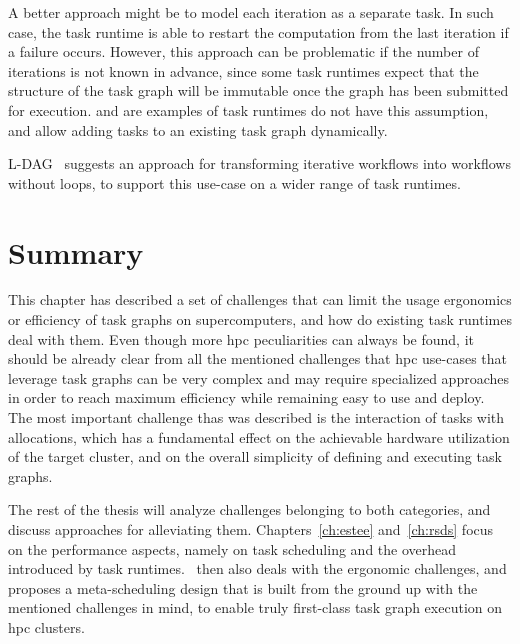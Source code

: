 A better approach might be to model each iteration as a separate task. In such case, the task
runtime is able to restart the computation from the last iteration if a failure occurs. However,
this approach can be problematic if the number of iterations is not known in advance, since some
task runtimes expect that the structure of the task graph will be immutable once the graph has been
submitted for execution. \dask{} and \ray{} are examples of task
runtimes do not have this assumption, and allow adding tasks to an existing task graph dynamically.

\textsc{L-DAG}~\cite{l-dag} suggests an approach for
transforming iterative workflows into workflows without loops, to support this use-case on a wider
range of task runtimes.

\section*{Summary}
This chapter has described a set of challenges that can limit the usage ergonomics or efficiency of
task graphs on supercomputers, and how do existing task runtimes deal with them. Even though more
\gls{hpc} peculiarities can always be found, it should be already clear from all the
mentioned challenges that \gls{hpc} use-cases that leverage task graphs can be very
complex and may require specialized approaches in order to reach maximum efficiency while remaining
easy to use and deploy. The most important challenge thas was described is the interaction of tasks
with allocations, which has a fundamental effect on the achievable hardware utilization of the
target cluster, and on the overall simplicity of defining and executing task graphs.

The rest of the thesis will analyze challenges belonging to both categories, and discuss approaches
for alleviating them. Chapters~\ref{ch:estee} and~\ref{ch:rsds} focus on the
performance aspects, namely on task scheduling and the overhead introduced by task
runtimes.~ then also deals with the ergonomic challenges, and proposes a
meta-scheduling design that is built from the ground up with the mentioned challenges in mind, to
enable truly first-class task graph execution on \gls{hpc} clusters.
